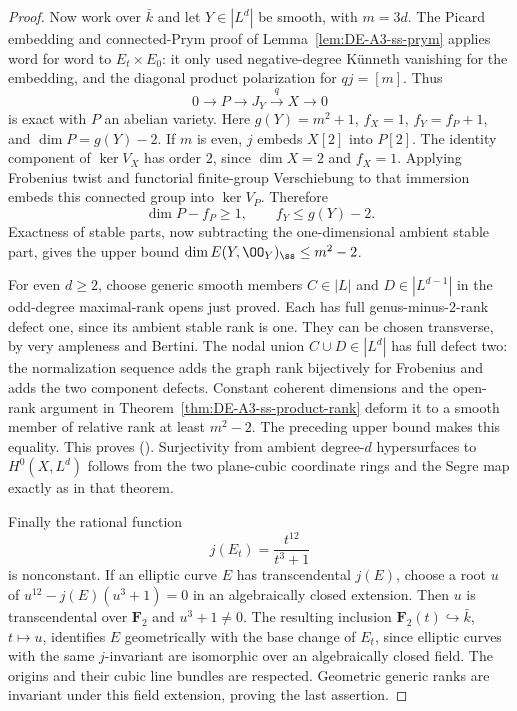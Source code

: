 \begin{proof}
Now work over $\bar k$ and let $Y\in|L^d|$ be smooth, with $m=3d$.
The Picard embedding and connected-Prym proof of
Lemma~\ref{lem:DE-A3-ss-prym} applies word for word to
$E_t\times E_0$: it only used negative-degree K\"unneth vanishing
for the embedding, and the diagonal product polarization for
$qj=[m]$.  Thus
\[
 0\longrightarrow P\longrightarrow J_Y\xrightarrow{q}X
 \longrightarrow0
\]
is exact with $P$ an abelian variety.  Here $g(Y)=m^2+1$,
$f_X=1$, $f_Y=f_P+1$, and $\dim P=g(Y)-2$.
If $m$ is even, $j$ embeds $X[2]$ into $P[2]$.  The identity
component of $\ker V_X$ has order $2$, since $\dim X=2$ and
$f_X=1$.  Applying Frobenius twist and functorial finite-group
Verschiebung to that immersion embeds this connected group
into $\ker V_P$.  Therefore
\[
 \dim P-f_P\ge1,\qquad f_Y\le g(Y)-2.
\]
Exactness of stable parts, now subtracting the one-dimensional
ambient stable part, gives the upper bound
$\dim E(Y,\OO_Y)_{\ss}\le m^2-2$.

For even $d\ge2$, choose generic smooth members
$C\in|L|$ and $D\in|L^{d-1}|$ in the odd-degree maximal-rank
opens just proved.  Each has full genus-minus-$2$-rank defect
one, since its ambient stable rank is one.  They can be chosen
transverse, by very ampleness and Bertini.  The nodal union
$C\cup D\in|L^d|$ has full defect two: the normalization
sequence adds the graph rank bijectively for Frobenius and
adds the two component defects.  Constant coherent dimensions
and the open-rank argument in
Theorem~\ref{thm:DE-A3-ss-product-rank} deform it to a smooth
member of relative rank at least $m^2-2$.  The preceding upper
bound makes this equality.  This proves (\ddagger).
Surjectivity from ambient degree-$d$ hypersurfaces to
$H^0(X,L^d)$ follows from the two plane-cubic coordinate rings
and the Segre map exactly as in that theorem.

Finally the rational function
\[
                         j(E_t)=\frac{t^{12}}{t^3+1}
\]
is nonconstant.  If an elliptic curve $E$ has transcendental
$j(E)$, choose a root $u$ of
$u^{12}-j(E)(u^3+1)=0$ in an algebraically closed extension.
Then $u$ is transcendental over $\mathbf F_2$ and $u^3+1\ne0$.
The resulting inclusion $\mathbf F_2(t)\hookrightarrow\bar k$,
$t\mapsto u$, identifies $E$ geometrically with the base change
of $E_t$, since elliptic curves with the same $j$-invariant
are isomorphic over an algebraically closed field.  The origins
and their cubic line bundles are respected.  Geometric generic
ranks are invariant under this field extension, proving the
last assertion.
\end{proof}


